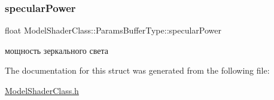 \subsubsection{\texorpdfstring{specular\+Power}{specularPower}}
{\footnotesize\ttfamily float Model\+Shader\+Class\+::\+Params\+Buffer\+Type\+::specular\+Power}



мощность зеркального света 



The documentation for this struct was generated from the following file\+:\begin{DoxyCompactItemize}
\item 
\hyperlink{_model_shader_class_8h}{Model\+Shader\+Class.\+h}\end{DoxyCompactItemize}
